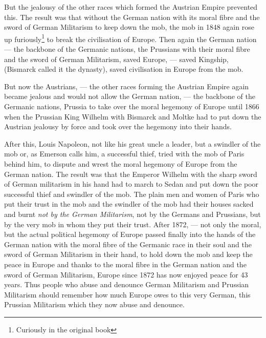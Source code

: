But the jealousy of the other races which formed the Austrian Empire prevented this.
The result was that without the German nation with its moral fibre and the sword of German Militarism to keep down the mob, the mob in 1848 again rose up furiously\footnote{Curiously in the original book} to break the civilisation of Europe.
Then again the German nation --- the backbone of the Germanic nations, the Prussians with their moral fibre and the sword of German Militarism, saved Europe, --- saved Kingship, (Bismarck called it the dynasty), saved civilisation in Europe from the mob.

But now the Austrians, --- the other races forming the Austrian Empire again became jealous and would not allow the German nation, --- the backbone of the Germanic nations, Prussia to take over the moral hegemony of Europe until 1866 when the Prussian King Wilhelm with Bismarck and Moltke  had to put down the Austrian jealousy by force and took over the hegemony into their hands.
 
After this, Louis Napoleon,  not like his great uncle a leader, but a swindler of the mob or, as Emerson calls him, a successful thief, tried with the mob of Paris behind him, to dispute and wrest the moral hegemony of Europe from the German nation.
The result was that the Emperor Wilhelm with the sharp sword of German militarism in his hand had to march to Sedan  and put down the poor successful thief and swindler of the mob.
The plain men and women of Paris who put their trust in the mob and the swindler of the mob had their houses sacked and burnt \emph{not by the German Militarism}, not by the Germans and Prussians, but by the very mob in whom they put their trust.
After 1872, --- not only the moral, but the actual political hegemony of Europe passed finally into the hands of the German nation with the moral fibre of the Germanic race in their soul and the sword of German Militarism in their hand, to hold down the mob and keep the peace in Europe and thanks to the moral fibre in the German nation and the sword of German Militarism, Europe since 1872 has now enjoyed peace for 43 years.
Thus people who abuse and denounce German Militarism and Prussian Militarism should remember how much Europe owes to this very German, this Prussian Militarism which they now abuse and denounce.

